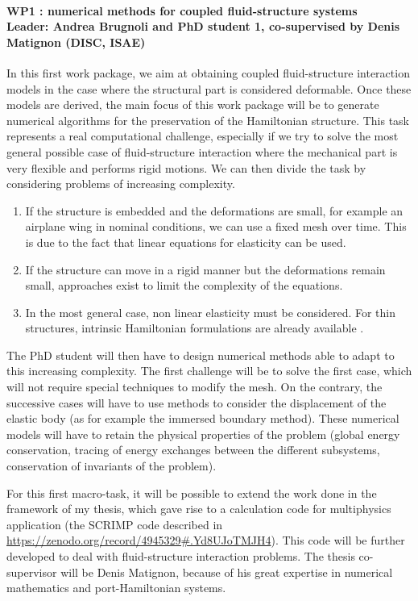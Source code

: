 \documentclass[12pt]{article}
\begin{document}
	\paragraph{\large WP1 : numerical methods for coupled fluid-structure systems\\
		Leader: Andrea Brugnoli and PhD student 1, co-supervised by Denis Matignon (DISC, ISAE)\\}
		In this first work package, we aim at obtaining coupled fluid-structure interaction models in the case where the structural part is considered deformable. Once these models are derived, the main focus of this work package will be to generate numerical algorithms for the preservation of the Hamiltonian structure. This task represents a real computational challenge, especially if we try to solve the most general possible case of fluid-structure interaction where the mechanical part is very flexible and performs rigid motions. We can then divide the task by considering problems of increasing complexity. 
		\begin{enumerate}
			\item If the structure is embedded and the deformations are small, for example an airplane wing in nominal conditions, we can use a fixed mesh over time. This is due to the fact that linear equations for elasticity can be used. 
			\item If the structure can move in a rigid manner but the deformations remain small, approaches exist to limit the complexity of the equations.
			\item In the most general case, non linear elasticity must be considered. For thin structures, intrinsic Hamiltonian formulations are already available \cite{hodges2003exact}.
		\end{enumerate}
		The PhD student will then have to design numerical methods able to adapt to this increasing complexity. The first challenge will be to solve the first case, which will not require special techniques to modify the mesh. On the contrary, the successive cases will have to use methods to consider the displacement of the elastic body (as for example the immersed boundary method). These numerical models will have to retain the physical properties of the problem (global energy conservation, tracing of energy exchanges between the different subsystems, conservation of invariants of the problem).
		
		For this first macro-task, it will be possible to extend the work done in the framework of my thesis, which gave rise to a calculation code for multiphysics application (the SCRIMP code described in \url{https://zenodo.org/record/4945329#.Yd8UJoTMJH4}). This code will be further developed to deal with fluid-structure interaction problems. The thesis co-supervisor will be Denis Matignon, because of his great expertise in numerical mathematics and port-Hamiltonian systems.
		
\end{document}
